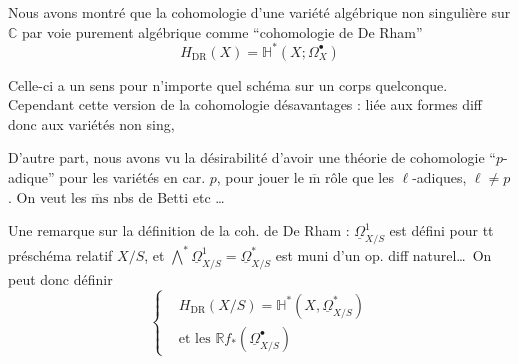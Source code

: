 

Nous avons montré que la cohomologie   d'une variété algébrique non singulière sur $\mathbb C$  par voie purement algébrique comme ``cohomologie de De Rham''
\[
H_{\mathrm{DR}}(X)=\mathbb H^*(X;\Omega_X^\bullet)
\]

Celle-ci a un sens pour n'importe quel schéma sur un corps quelconque. Cependant cette version de la cohomologie  désavantages : liée aux formes diff donc aux variétés non sing, 

D'autre part, nous avons vu la désirabilité d'avoir une théorie de cohomologie ``$p$-adique'' pour les variétés en car. $p$, pour jouer le $\overline{\mathrm m}$ rôle que les  $\ell$-adiques, $\ell\ne p$. On veut les $\overline{\mathrm m}\mathrm s$ nbs de Betti etc \ldots

Une remarque sur la définition de la coh. de De Rham : $\underline{\Omega}^1_{X/S}$ est défini pour tt préschéma relatif $X/S$, et $\bigwedge^*\underline{\Omega}^1_{X/S}=\underline{\Omega}^*_{X/S}$ est muni d'un op. diff naturel\ldots\ On peut donc définir
\[
\left\{
\begin{aligned}
&H_{\mathrm{DR}}(X/S)=\mathbb H^*(X,\underline{\Omega}^*_{X/S})\\
&\text{et les }\mathbb R f_*(\underline{\Omega}^\bullet_{X/S})
\end{aligned}
\right.
\]



